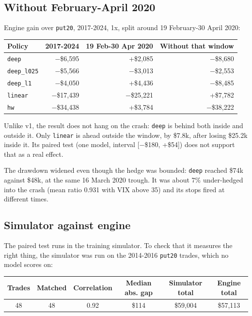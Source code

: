 \documentclass{article}
\begin{document}
\subsection{Without February-April 2020}

Engine gain over \texttt{put20}, 2017-2024, 1x, split around 19 February-30 April 2020:

\begin{center}\small
\begin{tabular}{lrrr}
\toprule
\textbf{Policy} & \textbf{2017-2024} & \textbf{19 Feb-30 Apr 2020} & \textbf{Without that window} \\
\midrule
\texttt{deep} & $-$\$6,595 & +\$2,085 & $-$\$8,680 \\
\texttt{deep\_\allowbreak{}l025} & $-$\$5,566 & $-$\$3,013 & $-$\$2,553 \\
\texttt{deep\_\allowbreak{}l1} & $-$\$4,050 & +\$4,436 & $-$\$8,485 \\
\texttt{linear} & $-$\$17,439 & $-$\$25,221 & +\$7,782 \\
\texttt{hw} & $-$\$34,438 & +\$3,784 & $-$\$38,222 \\
\bottomrule
\end{tabular}
\end{center}

Unlike v1, the result does not hang on the crash: \texttt{deep} is behind both inside and outside it. Only \texttt{linear} is ahead outside the window, by \$7.8k, after losing \$25.2k inside it. Its paired test (one model, interval [$-$\$180, +\$54]) does not support that as a real effect.

The drawdown widened even though the hedge was bounded: \texttt{deep} reached \$74k against \$48k, at the same 16 March 2020 trough. It was about 7\% under-hedged into the crash (mean ratio 0.931 with VIX above 35) and its stops fired at different times.

\subsection{Simulator against engine}

The paired test runs in the training simulator. To check that it measures the right thing, the simulator was run on the 2014-2016 \texttt{put20} trades, which no model scores on:

\begin{center}\small
\begin{tabular}{cccccc}
\toprule
\textbf{Trades} & \textbf{Matched} & \textbf{Correlation} & \textbf{Median abs. gap} & \textbf{Simulator total} & \textbf{Engine total} \\
\midrule
48 & 48 & 0.92 & \$114 & \$59,004 & \$57,113 \\
\bottomrule
\end{tabular}
\end{center}
\end{document}
